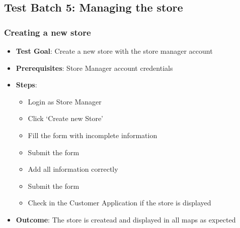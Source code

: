 \subsection{Test Batch 5: Managing the store}
\subsubsection{Creating a new store}
\begin{itemize}
    \item \textbf{Test Goal}: Create a new store with the store manager account
    \item \textbf{Prerequisites}: Store Manager account credentials
    \item \textbf{Steps}:
          \begin{itemize}
              \item Login as Store Manager
              \item Click `Create new Store'
              \item Fill the form with incomplete information
              \item Submit the form
              \item Add all information correctly
              \item Submit the form
              \item Check in the Customer Application if the store is displayed
          \end{itemize}
    \item \textbf{Outcome}: The store is createad and displayed in all maps as expected
\end{itemize}
